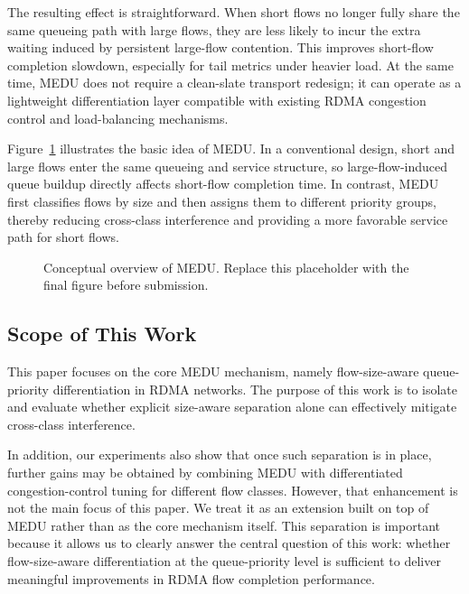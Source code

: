 \documentclass[conference]{IEEEtran}
\begin{document}
The resulting effect is straightforward. When short flows no longer fully share the same queueing path with large flows, they are less likely to incur the extra waiting induced by persistent large-flow contention. This improves short-flow completion slowdown, especially for tail metrics under heavier load. At the same time, MEDU does not require a clean-slate transport redesign; it can operate as a lightweight differentiation layer compatible with existing RDMA congestion control and load-balancing mechanisms.

Figure~\ref{fig:medu-overview} illustrates the basic idea of MEDU. In a conventional design, short and large flows enter the same queueing and service structure, so large-flow-induced queue buildup directly affects short-flow completion time. In contrast, MEDU first classifies flows by size and then assigns them to different priority groups, thereby reducing cross-class interference and providing a more favorable service path for short flows.

\begin{figure}[t]
  \centering
  \caption{Conceptual overview of MEDU. Replace this placeholder with the final figure before submission.}
  \label{fig:medu-overview}
\end{figure}

\subsection{Scope of This Work}

This paper focuses on the core MEDU mechanism, namely flow-size-aware queue-priority differentiation in RDMA networks. The purpose of this work is to isolate and evaluate whether explicit size-aware separation alone can effectively mitigate cross-class interference.

In addition, our experiments also show that once such separation is in place, further gains may be obtained by combining MEDU with differentiated congestion-control tuning for different flow classes. However, that enhancement is not the main focus of this paper. We treat it as an extension built on top of MEDU rather than as the core mechanism itself. This separation is important because it allows us to clearly answer the central question of this work: whether flow-size-aware differentiation at the queue-priority level is sufficient to deliver meaningful improvements in RDMA flow completion performance.
\end{document}
